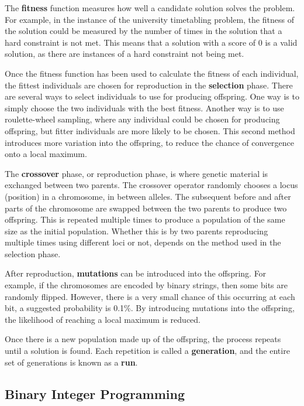 \documentclass[a4paper, 12pt]{report}
\begin{document}
The \textbf{fitness} function measures how well a candidate solution solves the
problem. For example, in the instance of the university timetabling problem,
the fitness of the solution could be measured by the number of times in the
solution that a hard constraint is not met. This means that a solution with a
score of 0 is a valid solution, as there are instances of a hard constraint not
being met.

Once the fitness function has been used to calculate the fitness of each
individual, the fittest individuals are chosen for reproduction in the
\textbf{selection} phase. There are several ways to select individuals to use
for producing offspring. One way is to simply choose the two individuals with
the best fitness. Another way is to use roulette-wheel sampling, where any
individual could be chosen for producing offspring, but fitter individuals are
more likely to be chosen. This second method introduces more variation into the
offspring, to reduce the chance of convergence onto a local maximum.

The \textbf{crossover} phase, or reproduction phase, is where genetic material
is exchanged between two parents. The crossover operator randomly chooses a
locus (position) in a chromosome, in between alleles. The subsequent before and
after parts of the chromosome are swapped between the two parents to produce
two offspring. This is repeated multiple times to produce a population of the
same size as the initial population. Whether this is by two parents reproducing
multiple times using different loci or not, depends on the method used in the
selection phase.

After reproduction, \textbf{mutations} can be introduced into the offspring. For example, if the chromosomes are encoded by binary strings, then some bits are randomly flipped. However, there is a very small chance of this occurring at each bit, a suggested probability is 0.1\%. By introducing mutations into the offspring, the likelihood of reaching a local maximum is reduced.

Once there is a new population made up of the offspring, the process repeats until a solution is found. Each repetition is called a \textbf{generation}, and the entire set of generations is known as a \textbf{run}.
\subsection{Binary Integer Programming}

\renewcommand\bibname{References}
%

%
\end{document}

